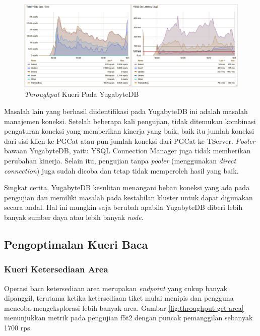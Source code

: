\begin{figure}[H]
    \centering
    \includegraphics[width=1\textwidth]{resources/chapter-4/yugabyte-ops.png}
    \caption{\textit{Throughput} Kueri Pada YugabyteDB}
    \label{fig:yugabytedb-throughput}
\end{figure}

Masalah lain yang berhasil diidentifikasi pada YugabyteDB ini adalah masalah manajemen koneksi. Setelah beberapa kali pengujian, tidak ditemukan kombinasi pengaturan koneksi yang memberikan kinerja yang baik, baik itu jumlah koneksi dari sisi klien ke PGCat atau pun jumlah koneksi dari PGCat ke TServer. \textit{Pooler} bawaan YugabyteDB, yaitu YSQL Connection Manager juga tidak memberikan perubahan kinerja. Selain itu, pengujian tanpa \textit{pooler} (menggunakan \textit{direct connection}) juga sudah dicoba dan tetap tidak memperoleh hasil yang baik.

Singkat cerita, YugabyteDB kesulitan menangani beban koneksi yang ada pada pengujian dan memiliki masalah pada kestabilan kluster untuk dapat digunakan secara andal. Hal ini mungkin saja berubah apabila YugabyteDB diberi lebih banyak sumber daya atau lebih banyak \textit{node}.

\subsection{Pengoptimalan Kueri Baca}

\subsubsection{Kueri Ketersediaan Area}

Operasi baca ketersediaan area merupakan \textit{endpoint} yang cukup banyak dipanggil, terutama ketika ketersediaan tiket mulai menipis dan pengguna mencoba mengeksplorasi lebih banyak area. Gambar \ref{fig:throughput-get-area} menunjukkan metrik pada pengujian f5t2 dengan puncak pemanggilan sebanyak 1700 rps.

